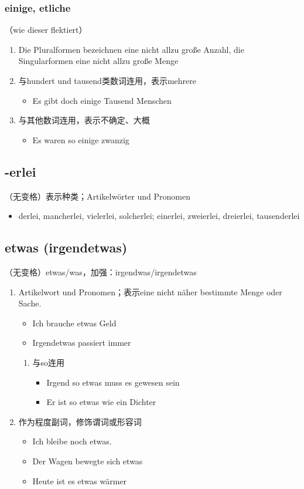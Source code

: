 \documentclass[UTF8]{report}
\begin{document}
\subsubsection{einige, etliche}
（wie dieser flektiert）
\begin{enumerate}
    \item Die Pluralformen bezeichnen eine nicht allzu große Anzahl, die Singularformen eine nicht allzu große Menge
    \item 与hundert und tausend类数词连用，表示mehrere
    \begin{itemize}
        \item Es gibt doch einige Tausend Menschen
    \end{itemize}
    \item 与其他数词连用，表示不确定、大概
    \begin{itemize}
        \item Es waren so einige zwanzig
    \end{itemize}
\end{enumerate}

\subsection{-erlei}
（无变格）表示种类；Artikelwörter und Pronomen
\begin{itemize}
    \item derlei, mancherlei, vielerlei, solcherlei; einerlei, zweierlei, dreierlei, tausenderlei
\end{itemize}
\subsection{etwas (irgendetwas)}
（无变格）etwas/was，加强：irgendwas/irgendetwas
\begin{enumerate}
    \item Artikelwort und Pronomen；表示eine nicht näher bestimmte Menge oder Sache.
    \begin{itemize}
        \item Ich brauche etwas Geld
        \item Irgendetwas passiert immer
    \end{itemize}
    \begin{enumerate}
        \item 与so连用
        \begin{itemize}
            \item Irgend so etwas muss es gewesen sein
            \item Er ist so etwas wie ein Dichter
        \end{itemize}
    \end{enumerate}
    \item 作为程度副词，修饰谓词或形容词
    \begin{itemize}
        \item Ich bleibe noch etwas.
        \item Der Wagen bewegte sich etwas
        \item Heute ist es etwas wärmer
    \end{itemize}
\end{enumerate}
\end{document}
